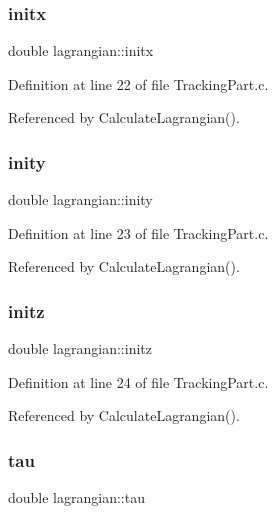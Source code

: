 \mbox{\label{structlagrangian_aa3a20ad03006649a17790bd31560af8f}} 
\subsubsection{\texorpdfstring{initx}{initx}}
{\footnotesize\ttfamily double lagrangian\+::initx}



Definition at line 22 of file Tracking\+Part.\+c.



Referenced by Calculate\+Lagrangian().

\mbox{\label{structlagrangian_a75fb1c376f05bb7ba3eaee13cab24067}} 
\subsubsection{\texorpdfstring{inity}{inity}}
{\footnotesize\ttfamily double lagrangian\+::inity}



Definition at line 23 of file Tracking\+Part.\+c.



Referenced by Calculate\+Lagrangian().

\mbox{\label{structlagrangian_a44e890e0ddb81f46f4aa3c1e7c029a73}} 
\subsubsection{\texorpdfstring{initz}{initz}}
{\footnotesize\ttfamily double lagrangian\+::initz}



Definition at line 24 of file Tracking\+Part.\+c.



Referenced by Calculate\+Lagrangian().

\mbox{\label{structlagrangian_a6c0717ffd474442f1651a1f7ebec625f}} 
\subsubsection{\texorpdfstring{tau}{tau}}
{\footnotesize\ttfamily double lagrangian\+::tau}



